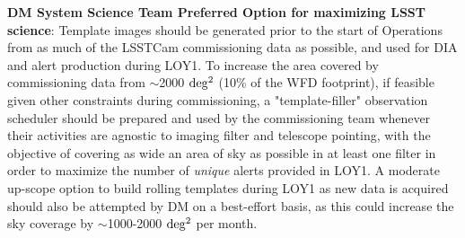 \documentclass[DM,lsstdraft,toc]{lsstdoc}
\begin{document}
{\bf DM System Science Team Preferred Option for maximizing LSST science}: Template images should be generated prior to the start of Operations from as much of the LSSTCam commissioning data as possible, and used for DIA and alert production during LOY1.
To increase the area covered by commissioning data from $\sim$2000 $\rm deg^2$ (10\% of the WFD footprint), if feasible given other constraints during commissioning, a "template-filler" observation scheduler should be prepared and used by the commissioning team whenever their activities are agnostic to imaging filter and telescope pointing, with the objective of covering as wide an area of sky as possible in at least one filter in order to maximize the number of {\em unique} alerts provided in LOY1.
A moderate up-scope option to build rolling templates during LOY1 as new data is acquired should also be attempted by DM on a best-effort basis, as this could increase the sky coverage by $\sim$1000-2000 $\rm deg^2$ per month.

\clearpage





\end{document}
